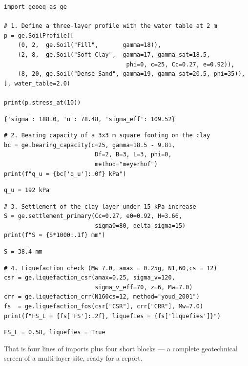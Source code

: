 \documentclass[11pt,a4paper,openany]{book}
\begin{document}
\begin{lstlisting}
import geoeq as ge

# 1. Define a three-layer profile with the water table at 2 m
p = ge.SoilProfile([
    (0, 2,  ge.Soil("Fill",       gamma=18)),
    (2, 8,  ge.Soil("Soft Clay",  gamma=17, gamma_sat=18.5,
                                   phi=0, c=25, Cc=0.27, e=0.92)),
    (8, 20, ge.Soil("Dense Sand", gamma=19, gamma_sat=20.5, phi=35)),
], water_table=2.0)

print(p.stress_at(10))
\end{lstlisting}
\begin{lstlisting}[style=output]
{'sigma': 188.0, 'u': 78.48, 'sigma_eff': 109.52}
\end{lstlisting}

\begin{lstlisting}
# 2. Bearing capacity of a 3x3 m square footing on the clay
bc = ge.bearing_capacity(c=25, gamma=18.5 - 9.81,
                          Df=2, B=3, L=3, phi=0,
                          method="meyerhof")
print(f"q_u = {bc['q_u']:.0f} kPa")
\end{lstlisting}
\begin{lstlisting}[style=output]
q_u = 192 kPa
\end{lstlisting}

\begin{lstlisting}
# 3. Settlement of the clay layer under 15 kPa increase
S = ge.settlement_primary(Cc=0.27, e0=0.92, H=3.66,
                          sigma0=80, delta_sigma=15)
print(f"S = {S*1000:.1f} mm")
\end{lstlisting}
\begin{lstlisting}[style=output]
S = 38.4 mm
\end{lstlisting}

\begin{lstlisting}
# 4. Liquefaction check (Mw 7.0, amax = 0.25g, N1,60,cs = 12)
csr = ge.liquefaction_csr(amax=0.25, sigma_v=120,
                          sigma_v_eff=70, z=6, Mw=7.0)
crr = ge.liquefaction_crr(N160cs=12, method="youd_2001")
fs  = ge.liquefaction_fos(csr["CSR"], crr["CRR"], Mw=7.0)
print(f"FS_L = {fs['FS']:.2f}, liquefies = {fs['liquefies']}")
\end{lstlisting}
\begin{lstlisting}[style=output]
FS_L = 0.58, liquefies = True
\end{lstlisting}

That is four lines of imports plus four short blocks --- a
complete geotechnical screen of a multi-layer site, ready for a
report.
\end{document}
